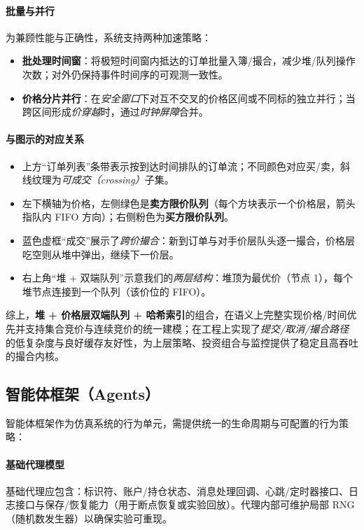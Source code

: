 \documentclass{mancls}
\begin{document}
\paragraph{批量与并行}
为兼顾性能与正确性，系统支持两种加速策略：
\begin{itemize}
  \item \textbf{批处理时间窗}：将极短时间窗内抵达的订单批量入簿/撮合，减少堆/队列操作次数；对外仍保持事件时间序的可观测一致性。
  \item \textbf{价格分片并行}：在\emph{安全窗口}下对互不交叉的价格区间或不同标的独立并行；当跨区间形成\emph{价穿越}时，通过\emph{时钟屏障}合并。
\end{itemize}

\paragraph{与图示的对应关系}
\begin{itemize}
  \item 上方“订单列表”条带表示按到达时间排队的订单流；不同颜色对应买/卖，斜线纹理为\emph{可成交（crossing）}子集。
  \item 左下横轴为价格，左侧绿色是\textbf{卖方限价队列}（每个方块表示一个价格层，箭头指队内 FIFO 方向）；右侧粉色为\textbf{买方限价队列}。
  \item 蓝色虚框“成交”展示了\emph{跨价撮合}：新到订单与对手价层队头逐一撮合，价格层吃空则从堆中弹出，继续下一价层。
  \item 右上角“堆 + 双端队列”示意我们的\emph{两层结构}：堆顶为最优价（节点 1），每个堆节点连接到一个队列（该价位的 FIFO）。
\end{itemize}

综上，\textbf{堆 + 价格层双端队列 + 哈希索引}的组合，在语义上完整实现价格/时间优先并支持集合竞价与连续竞价的统一建模；在工程上实现了\emph{提交/取消/撮合路径}的低复杂度与良好缓存友好性，为上层策略、投资组合与监控提供了稳定且高吞吐的撮合内核。



\subsection{智能体框架（Agents）}
智能体框架作为仿真系统的行为单元，需提供统一的生命周期与可配置的行为策略：

\paragraph{基础代理模型}
基础代理应包含：标识符、账户/持仓状态、消息处理回调、心跳/定时器接口、日志接口与保存/恢复能力（用于断点恢复或实验回放）。代理内部可维护局部 RNG（随机数发生器）以确保实验可重现。
\end{document}
